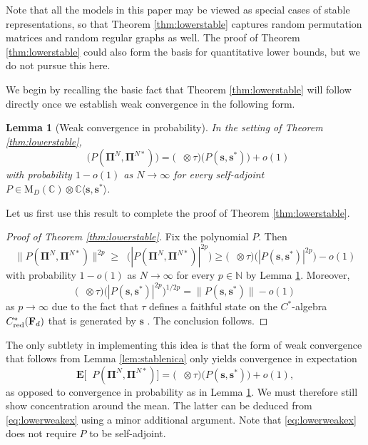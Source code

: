 \documentclass[10pt,reqno]{amsart}
\newtheorem{lem}[thm]{Lemma}
\theoremstyle{definition}
\theoremstyle{remark}
\numberwithin{equation}{section}
\numberwithin{figure}{section}
\numberwithin{table}{section}
\newcommand{\ntrD}{\mathop{\mathrm{tr}_D}}
\newcommand{\ntrDDN}{\mathop{\mathrm{tr}_{DD_N}}}
\begin{document}
Note that all the models in this paper may be viewed as special cases of 
stable representations, so that Theorem \ref{thm:lowerstable} captures 
random permutation matrices and random regular graphs as well.
The proof of Theorem \ref{thm:lowerstable} could also form the basis for 
quantitative lower bounds, but we do not pursue this here.

We begin by recalling the basic fact that Theorem \ref{thm:lowerstable} 
will follow directly once we establish weak convergence in the following 
form.

\begin{lem}[Weak convergence in probability]
\label{lem:lowerweak}
In the setting of Theorem \ref{thm:lowerstable},
$$
        {\ntrDDN}\big(P(\boldsymbol{\Pi}^N,\boldsymbol{\Pi}^{N*})\big) 
        =
        \big({\ntrD}\otimes\tau)(P(\boldsymbol{s},\boldsymbol{s}^*)\big)
        +o(1)
$$
with probability $1-o(1)$ as $N\to\infty$ for every self-adjoint
$P\in \mathrm{M}_D(\mathbb{C})
\otimes \mathbb{C}\langle\boldsymbol{s},\boldsymbol{s}^*\rangle$.
\end{lem}

Let us first use this result to complete the proof of 
Theorem \ref{thm:lowerstable}.

\begin{proof}[Proof of Theorem \ref{thm:lowerstable}]
Fix the polynomial $P$. Then
$$
        \|P(\boldsymbol{\Pi}^N,\boldsymbol{\Pi}^{N*})\|^{2p}
        \ge
        {\ntrDDN}\big(|P(\boldsymbol{\Pi}^N,\boldsymbol{\Pi}^{N*})|^{2p}\big)
        \ge 
        \big({\ntrD}\otimes\tau)(|P(\boldsymbol{s},\boldsymbol{s}^*)|^{2p}\big)
        -o(1)
$$
with probability $1-o(1)$ as $N\to\infty$ for every $p\in\mathbb{N}$ by
Lemma \ref{lem:lowerweak}. Moreover,
$$
        \big({\ntrD}\otimes\tau)(|P(\boldsymbol{s},\boldsymbol{s}^*)|^{2p}\big)^{1/2p}
        = \|P(\boldsymbol{s},\boldsymbol{s}^*)\|-o(1)
$$
as $p\to\infty$ due to the fact that $\tau$ defines a faithful state on 
the $C^*$-algebra $C^*_{\rm red}(\mathbf{F}_d)$ that is
generated by $\boldsymbol{s}$ \cite[Proposition 3.12]{NS06}. The 
conclusion follows.
\end{proof}

The only subtlety in implementing this idea is that the form of weak 
convergence that follows from Lemma \ref{lem:stablenica} only 
yields convergence in expectation
\begin{equation}
\label{eq:lowerweakex}
        \mathbf{E}\big[
        {\ntrDDN} P(\boldsymbol{\Pi}^N,\boldsymbol{\Pi}^{N*})
        \big]
        =
        \big({\ntrD}\otimes\tau)(P(\boldsymbol{s},\boldsymbol{s}^*)\big)
        +o(1),
\end{equation}
as opposed to convergence in probability as in 
Lemma \ref{lem:lowerweak}. 
We must therefore still show concentration
around the mean. The latter can be deduced from \eqref{eq:lowerweakex}
using a minor additional argument. Note that 
\eqref{eq:lowerweakex} does not require $P$ to be self-adjoint.
\end{document}
